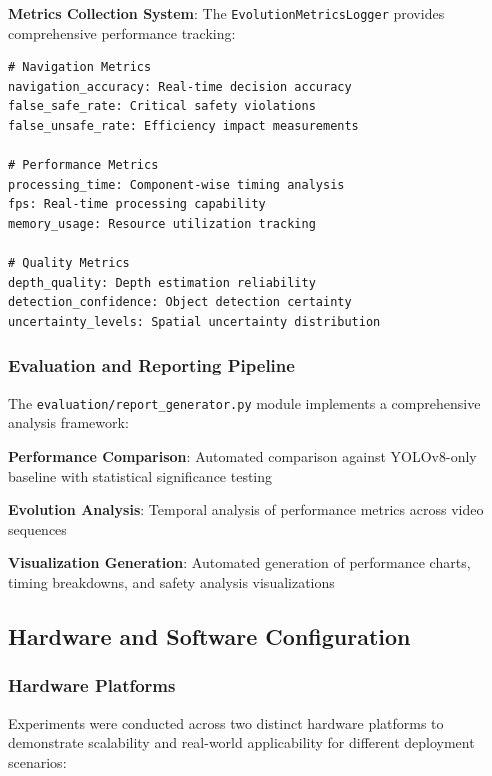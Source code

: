 \documentclass[12pt,oneside]{book}
\begin{document}
\textbf{Metrics Collection System}:
The \texttt{EvolutionMetricsLogger} provides comprehensive performance tracking:

\begin{verbatim}
# Navigation Metrics
navigation_accuracy: Real-time decision accuracy
false_safe_rate: Critical safety violations
false_unsafe_rate: Efficiency impact measurements

# Performance Metrics
processing_time: Component-wise timing analysis
fps: Real-time processing capability
memory_usage: Resource utilization tracking

# Quality Metrics
depth_quality: Depth estimation reliability
detection_confidence: Object detection certainty
uncertainty_levels: Spatial uncertainty distribution
\end{verbatim}

\subsubsection{Evaluation and Reporting Pipeline}

The \texttt{evaluation/report\_generator.py} module implements a comprehensive analysis framework:

\textbf{Performance Comparison}: Automated comparison against YOLOv8-only baseline with statistical significance testing

\textbf{Evolution Analysis}: Temporal analysis of performance metrics across video sequences

\textbf{Visualization Generation}: Automated generation of performance charts, timing breakdowns, and safety analysis visualizations

\subsection{Hardware and Software Configuration}

\subsubsection{Hardware Platforms}

Experiments were conducted across two distinct hardware platforms to demonstrate scalability and real-world applicability for different deployment scenarios:
\end{document}

